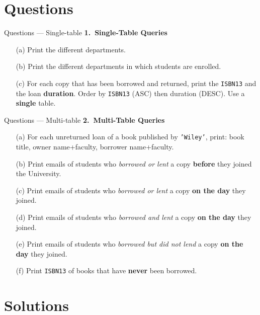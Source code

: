 \documentclass{beamer}
\begin{document}
\section{Questions}
\begin{frame}{Questions — Single-table}
\footnotesize
\textbf{1.\ Single-Table Queries}
\begin{enumerate}\itemsep2pt
  \item[(a)] Print the different departments.
  \item[(b)] Print the different departments in which students are enrolled.
  \item[(c)] For each copy that has been borrowed and returned, print the \texttt{ISBN13} and the loan \textbf{duration}. Order by \texttt{ISBN13} (ASC) then duration (DESC). Use a \textbf{single} table.
\end{enumerate}
\end{frame}

\begin{frame}{Questions — Multi-table}
\footnotesize
\textbf{2.\ Multi-Table Queries}
\begin{enumerate}\itemsep2pt
  \item[(a)] For each unreturned loan of a book published by \texttt{'Wiley'}, print: book title, owner name+faculty, borrower name+faculty.
  \item[(b)] Print emails of students who \emph{borrowed or lent} a copy \textbf{before} they joined the University.
  \item[(c)] Print emails of students who \emph{borrowed or lent} a copy \textbf{on the day} they joined.
  \item[(d)] Print emails of students who \emph{borrowed and lent} a copy \textbf{on the day} they joined.
  \item[(e)] Print emails of students who \emph{borrowed but did not lend} a copy \textbf{on the day} they joined.
  \item[(f)] Print \texttt{ISBN13} of books that have \textbf{never} been borrowed.
\end{enumerate}
\end{frame}
\section{Solutions}
\end{document}
